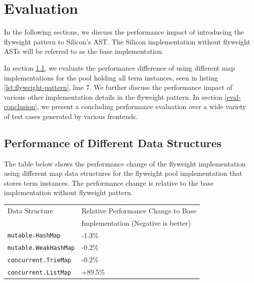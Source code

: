 \documentclass[11pt]{article}
\begin{document}
    \newpage
    \section{Evaluation}

    In the following sections, we discuss the performance
    impact of introducing the flyweight pattern to Silicon's AST.
    The Silicon implementation without flyweight
    ASTs will be referred to as the base implementation.

    In section \ref{eval-data-structures}, we evaluate the performance difference of using
    different map implementations for the pool holding all
    term instances, seen in listing \ref{lst:flyweight-pattern}, line 7.
    We further discuss the performance impact
    of various other implementation details in the flyweight pattern.
    In section \ref{eval-conclusion}, we present a concluding performance
    evaluation over a wide variety of test cases generated by various frontends.

    \subsection{Performance of Different Data Structures} \label{eval-data-structures}
    

    The table below shows the performance change of the flyweight implementation
    using different map data structures for the flyweight pool implementation that stores
    term instances. The performance change is relative to the base implementation
    without flyweight pattern.

    \begin{center}
        \begin{tabular}{ ll } 
        \hline
        Data Structure & Relative Performance Change to Base \\ 
        & Implementation (Negative is better) \\
        \hline
        \texttt{mutable.HashMap} & -1.3\% \\ 
        \texttt{mutable.WeakHashMap} & -0.2\% \\
        \texttt{concurrent.TrieMap} & -0.2\% \\
        \texttt{concurrent.ListMap} & +89.5\% \\ 
        \hline
        \end{tabular}
    \end{center}
\end{document}
